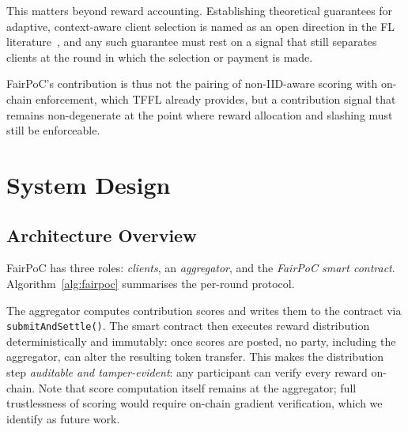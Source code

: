 \documentclass[conference]{IEEEtran}
\theoremstyle{remark}
\begin{document}
This matters beyond reward accounting. Establishing theoretical
guarantees for adaptive, context-aware client selection is named as an
open direction in the FL literature~\cite{ziaeinejad2026context}, and any
such guarantee must rest on a signal that still separates clients at the
round in which the selection or payment is made.

FairPoC's contribution is thus not the pairing of non-IID-aware scoring
with on-chain enforcement, which TFFL already provides, but a contribution
signal that remains non-degenerate at the point where reward allocation
and slashing must still be enforceable.

\section{System Design}

\subsection{Architecture Overview}

FairPoC has three roles: \emph{clients}, an \emph{aggregator}, and the
\emph{FairPoC smart contract}. Algorithm~\ref{alg:fairpoc} summarises
the per-round protocol.

\begin{algorithm}[t]
\caption{FairPoC Training Protocol}
\label{alg:fairpoc}
\end{algorithm}

The aggregator computes contribution scores and writes them to the
contract via \texttt{submitAndSettle()}. The smart contract then executes reward
distribution deterministically and immutably: once scores are posted,
no party, including the aggregator, can alter the resulting token
transfer. This makes the distribution step \emph{auditable and
tamper-evident}: any participant can verify every reward on-chain. Note
that score computation itself remains at the aggregator; full
trustlessness of scoring would require on-chain gradient verification,
which we identify as future work.
\end{document}
